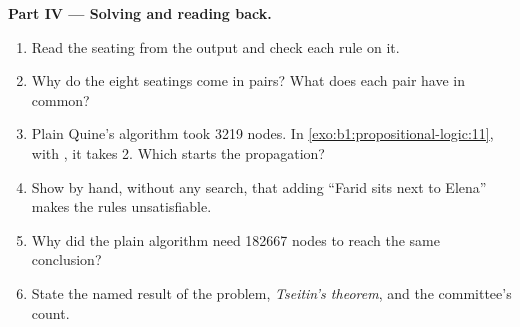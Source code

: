 \begin{problem}
\medskip\noindent\textbf{Part IV --- Solving and reading back.}
\begin{enumerate}[resume]
\item Read the seating from the output and check each rule on it.
\item Why do the eight seatings come in pairs? What does each pair have in common?
\item Plain Quine's algorithm took 3219 nodes. In \cref{exo:b1:propositional-logic:11}, with , it
takes 2. Which  starts the propagation?
\item Show by hand, without any search, that adding ``Farid sits next to Elena'' makes the rules unsatisfiable.
\item Why did the plain algorithm need 182667 nodes to reach the same conclusion?
\item State the named result of the problem, \emph{Tseitin's theorem}, and the committee's count.
\end{enumerate}
\end{problem}
